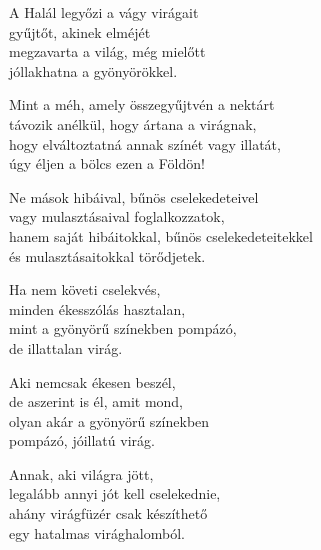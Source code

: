 \begin{dhpverse}

 A Halál legyőzi a vágy virágait\\
gyűjtőt, akinek elméjét\\
megzavarta a világ, még mielőtt\\
jóllakhatna a gyönyörökkel.

 Mint a méh, amely összegyűjtvén a nektárt\\
távozik anélkül, hogy ártana a virágnak,\\
hogy elváltoztatná annak színét vagy illatát,\\
úgy éljen a bölcs ezen a Földön!

 Ne mások hibáival, bűnös cselekedeteivel\\
vagy mulasztásaival foglalkozzatok,\\
hanem saját hibáitokkal, bűnös cselekedeteitekkel\\
és mulasztásaitokkal törődjetek.

 Ha nem követi cselekvés,\\
minden ékesszólás hasztalan,\\
mint a gyönyörű színekben pompázó,\\
de illattalan virág.

 Aki nemcsak ékesen beszél,\\
de aszerint is él, amit mond,\\
olyan akár a gyönyörű színekben\\
pompázó, jóillatú virág.

 Annak, aki világra jött,\\
legalább annyi jót kell cselekednie,\\
ahány virágfüzér csak készíthető\\
egy hatalmas virághalomból.

\end{dhpverse}
\newpage
